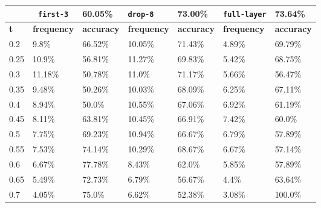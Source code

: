 
\begin{table}[t]
\centering
\begin{tabular}{lllllll} %
\hline

\multicolumn{1}{c}{}& 
\multicolumn{1}{c}{\texttt{first-3}} & \multicolumn{1}{l|}{60.05\%} 
& \multicolumn{1}{l}{\texttt{drop-8}} & \multicolumn{1}{l|}{73.00\%}
& \multicolumn{1}{l}{\texttt{full-layer}} & 73.64\%
\\ \hline
\multicolumn{1}{l|}{\textbf{t}} &
\multicolumn{1}{l|}{\textbf{frequency}} & 
\multicolumn{1}{l|}{\textbf{accuracy}} & 
\multicolumn{1}{l|}{\textbf{frequency}} & 
\multicolumn{1}{l|}{\textbf{accuracy}} & 
\multicolumn{1}{l|}{\textbf{frequency}} & 
\multicolumn{1}{l|}{\textbf{accuracy}} \\ \hline
	\multicolumn{1}{l|}{0.2}&  9.8\% & \multicolumn{1}{l|}{66.52\%}& 10.05\% & \multicolumn{1}{l|}{71.43\%}& 4.89\% & 69.79\%\\ 
\multicolumn{1}{l|}{0.25}&  10.9\% & \multicolumn{1}{l|}{56.81\%}& 11.27\% & \multicolumn{1}{l|}{69.83\%}& 5.42\% & 68.75\%\\ 
\multicolumn{1}{l|}{0.3}&  11.18\% & \multicolumn{1}{l|}{50.78\%}& 11.0\% & \multicolumn{1}{l|}{71.17\%}& 5.66\% & 56.47\%\\ 
\multicolumn{1}{l|}{0.35}&  9.48\% & \multicolumn{1}{l|}{50.26\%}& 10.03\% & \multicolumn{1}{l|}{68.09\%}& 6.25\% & 67.11\%\\ 
\multicolumn{1}{l|}{0.4}&  8.94\% & \multicolumn{1}{l|}{50.0\%}& 10.55\% & \multicolumn{1}{l|}{67.06\%}& 6.92\% & 61.19\%\\ 
\multicolumn{1}{l|}{0.45}&  8.11\% & \multicolumn{1}{l|}{63.81\%}& 10.45\% & \multicolumn{1}{l|}{66.91\%}& 7.42\% & 60.0\%\\ 
\multicolumn{1}{l|}{0.5}&  7.75\% & \multicolumn{1}{l|}{69.23\%}& 10.94\% & \multicolumn{1}{l|}{66.67\%}& 6.79\% & 57.89\%\\ 
\multicolumn{1}{l|}{0.55}&  7.53\% & \multicolumn{1}{l|}{74.14\%}& 10.29\% & \multicolumn{1}{l|}{68.67\%}& 6.67\% & 57.14\%\\ 
\multicolumn{1}{l|}{0.6}&  6.67\% & \multicolumn{1}{l|}{77.78\%}& 8.43\% & \multicolumn{1}{l|}{62.0\%}& 5.85\% & 57.89\%\\ 
\multicolumn{1}{l|}{0.65}&  5.49\% & \multicolumn{1}{l|}{72.73\%}& 6.79\% & \multicolumn{1}{l|}{56.67\%}& 4.4\% & 63.64\%\\ 
\multicolumn{1}{l|}{0.7}&  4.05\% & \multicolumn{1}{l|}{75.0\%}& 6.62\% & \multicolumn{1}{l|}{52.38\%}& 3.08\% & 100.0\%\\ 

\end{tabular}
\end{table}
